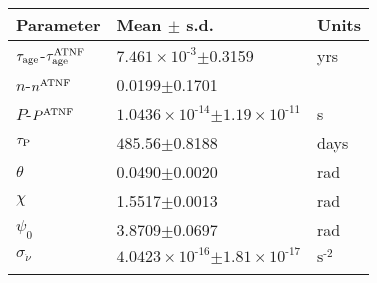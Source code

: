 \begin{tabular}{lll} \hhline{===}
        Parameter & Mean $\pm$ s.d. &  Units\\ \hline
$\tau_{\mathrm{age}}$\textrm{-}$\tau_{\mathrm{age}}^{\tiny\textrm{ATNF}}$
 & ${7.461}\times 10^{\textrm{-}3}$$\pm$0.3159 & yrs\\
$n$\textrm{-}$n^{\tiny\textrm{ATNF}}$ & 0.0199$\pm$0.1701 & \\
$P$\textrm{-}$P^{\tiny\textrm{ATNF}}$
 & ${1.0436}\times 10^{\textrm{-}14}$$\pm$${1.19}\times 10^{\textrm{-}11}$ & s\\
$\tau_{\mathrm{P}}$ & $485.56$$\pm$0.8188 & days\\
$\theta$ & 0.0490$\pm$0.0020 & rad\\
$\chi$ & 1.5517$\pm$0.0013 & rad\\
$\psi_0$ & 3.8709$\pm$0.0697 & rad\\
$\sigma_{\dot{\nu}}$ & ${4.0423}\times 10^{\textrm{-}16}$$\pm$${1.81}\times 10^{\textrm{-}17}$ & $\mathrm{s}^{\textrm{-}2}$\\
\hhline{===}
\end{tabular}
